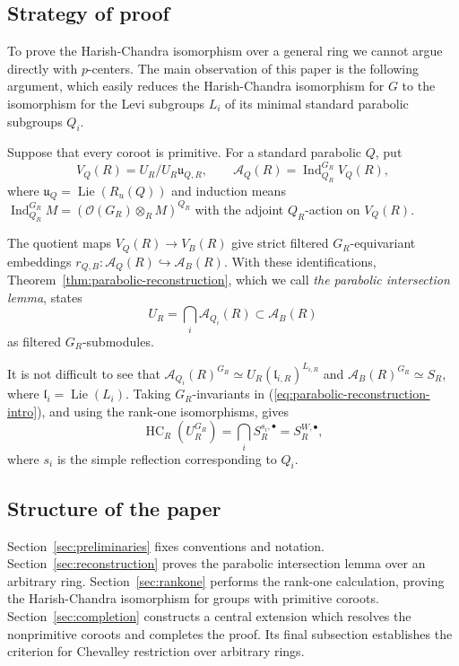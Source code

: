 \documentclass[twoside,a4paper,12pt,reqno]{amsart}
\theoremstyle{remark}
\numberwithin{equation}{section}
\newcommand{\cO}{\mathcal O}
\newcommand{\fl}{\mathfrak l}
\newcommand{\fu}{\mathfrak u}
\newcommand{\cA}{\mathcal A}
\DeclareMathOperator{\Lie}{Lie}
\DeclareMathOperator{\HC}{HC}
\newcommand{\into}{\hookrightarrow}
\begin{document}
\subsection{Strategy of proof}\label{subsec:our-method}

To prove the Harish-Chandra isomorphism over a general ring we cannot argue directly with \(p\)-centers. The main observation of this paper is the following argument, which easily reduces the Harish-Chandra isomorphism for \(G\) to the isomorphism for the Levi subgroups \(L_i\) of its minimal standard parabolic subgroups \(Q_i\).

Suppose that every coroot is primitive. For a standard parabolic \(Q\), put
\[
V_Q(R)=U_R/U_R\fu_{Q,R},\qquad
\cA_Q(R)=\operatorname{Ind}_{Q_R}^{G_R}V_Q(R),
\]
where \(\fu_Q=\Lie(R_u(Q))\) and induction means
\(\operatorname{Ind}_{Q_R}^{G_R}M=(\cO(G_R)\otimes_R M)^{Q_R}\) with the adjoint \(Q_R\)-action on \(V_Q(R)\).

The quotient maps \(V_Q(R)\to V_B(R)\) give strict filtered
\(G_R\)-equivariant embeddings
\(r_{Q,B}:\cA_Q(R)\into\cA_B(R)\).
With these identifications, Theorem~\ref{thm:parabolic-reconstruction}, which we call \emph{the parabolic intersection lemma}, states
\begin{equation}\label{eq:parabolic-reconstruction-intro}
U_R=\bigcap_i\cA_{Q_i}(R)\subset\cA_B(R)
\end{equation}
as filtered \(G_R\)-submodules.

It is not difficult to see that
\(\cA_{Q_i}(R)^{G_R}\simeq U_R(\fl_{i,R})^{L_{i,R}}\) and
\(\cA_B(R)^{G_R}\simeq S_R\), where \(\fl_i=\Lie(L_i)\).
Taking \(G_R\)-invariants in (\ref{eq:parabolic-reconstruction-intro}), and using the rank-one isomorphisms, gives
\begin{equation}\label{eq:hc_introduction}
\HC_R(U_R^{G_R})=\bigcap_i S_R^{s_i,\bullet}=S_R^{W,\bullet},
\end{equation}
where \(s_i\) is the simple reflection corresponding to \(Q_i\).


\subsection{Structure of the paper}
Section~\ref{sec:preliminaries} fixes conventions and notation.
Section~\ref{sec:reconstruction} proves the parabolic intersection lemma over an arbitrary ring. Section~\ref{sec:rankone} performs the rank-one calculation, proving
the Harish-Chandra isomorphism for groups with primitive coroots.
Section~\ref{sec:completion} constructs a central extension which resolves the nonprimitive coroots
and completes the proof. Its final
subsection establishes the criterion for Chevalley restriction over
arbitrary rings.
\end{document}
